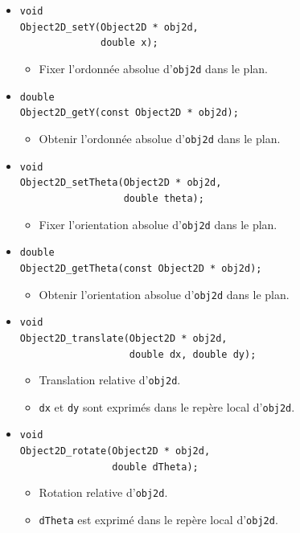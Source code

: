 \documentclass[12pt]{article}
\begin{document}
\begin{itemize}
\item \verb!void! \\
      \verb!Object2D_setY(Object2D * obj2d,! \\
      \verb!              double x);!
      \begin{itemize}
      \item Fixer l'ordonn\'ee absolue d'\verb!obj2d! dans le plan.
      \end{itemize}
\item \verb!double! \\
      \verb!Object2D_getY(const Object2D * obj2d);!
      \begin{itemize}
      \item Obtenir l'ordonn\'ee absolue d'\verb!obj2d! dans le plan.
      \end{itemize}
\item \verb!void! \\
      \verb!Object2D_setTheta(Object2D * obj2d,! \\
      \verb!                  double theta);!
      \begin{itemize}
      \item Fixer l'orientation absolue d'\verb!obj2d! dans le plan.
      \end{itemize}
\item \verb!double! \\
      \verb!Object2D_getTheta(const Object2D * obj2d);!
      \begin{itemize}
      \item Obtenir l'orientation absolue d'\verb!obj2d! dans le plan.
      \end{itemize}
\item \verb!void! \\
      \verb!Object2D_translate(Object2D * obj2d,! \\
      \verb!                   double dx, double dy);!
      \begin{itemize}
      \item Translation relative d'\verb!obj2d!.
      \item \verb!dx! et \verb!dy! sont exprim\'es dans le rep\`ere
            local d'\verb!obj2d!.
      \end{itemize}
\item \verb!void! \\
      \verb!Object2D_rotate(Object2D * obj2d,! \\
      \verb!                double dTheta);!
      \begin{itemize}
      \item Rotation relative d'\verb!obj2d!.
      \item \verb!dTheta! est exprim\'e dans le rep\`ere
            local d'\verb!obj2d!.
      \end{itemize}
\end{itemize}
\end{document}
